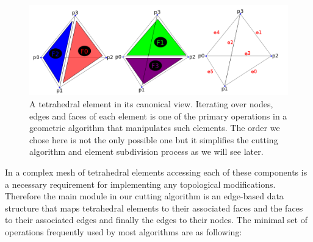 \begin{figure}[H]
  \centering
  \includegraphics[width=1.0\linewidth]{figures/cutting/tetconfig3.png}
  \caption{\label{fig:tetconfig3}
  {A tetrahedral element in its canonical view. Iterating over nodes, edges and faces of each element is
  one of the primary operations in a geometric algorithm that manipulates such elements. The order we chose here is not the
  only possible one but it simplifies the cutting algorithm and element subdivision process as we will see later.}
}
\end{figure}


In a complex mesh of tetrahedral elements accessing each of these components is a necessary requirement for 
implementing any topological modifications. Therefore the main module in our cutting algorithm is an edge-based
data structure that maps tetrahedral elements to their associated faces and the faces to their associated edges and
finally the edges to their nodes. The minimal set of operations frequently used by most algorithms are as following:

